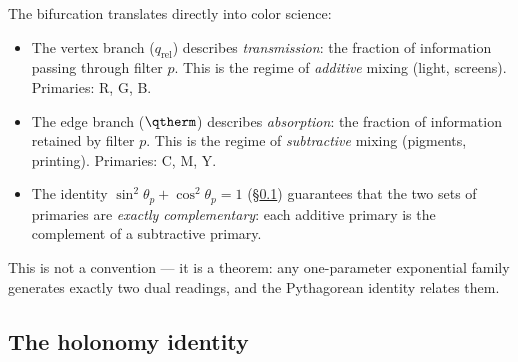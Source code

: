\documentclass[12pt,a4paper]{article}
\providecommand{\qrel}{\ensuremath{q_{\mathrm{rel}}}}
\begin{document}
\begin{remark}
The bifurcation translates directly into color science:
\begin{itemize}[nosep]
\item The vertex branch ($\qrel$) describes \emph{transmission}:
  the fraction of information passing through filter $p$. This is the
  regime of \emph{additive} mixing (light, screens).
  Primaries: R, G, B.
\item The edge branch ($\qtherm$) describes \emph{absorption}:
  the fraction of information retained by filter $p$. This is the
  regime of \emph{subtractive} mixing (pigments, printing).
  Primaries: C, M, Y.
\item The identity $\sin^2\!\theta_p + \cos^2\!\theta_p = 1$
  (\S\ref{app:holonomy}) guarantees that the two sets of primaries are
  \emph{exactly complementary}: each additive primary is the
  complement of a subtractive primary.
\end{itemize}
This is not a convention --- it is a theorem: any one-parameter
exponential family generates exactly two dual readings, and the
Pythagorean identity relates them.
\end{remark}

\subsection{The holonomy identity}
\label{app:holonomy}
\end{document}
